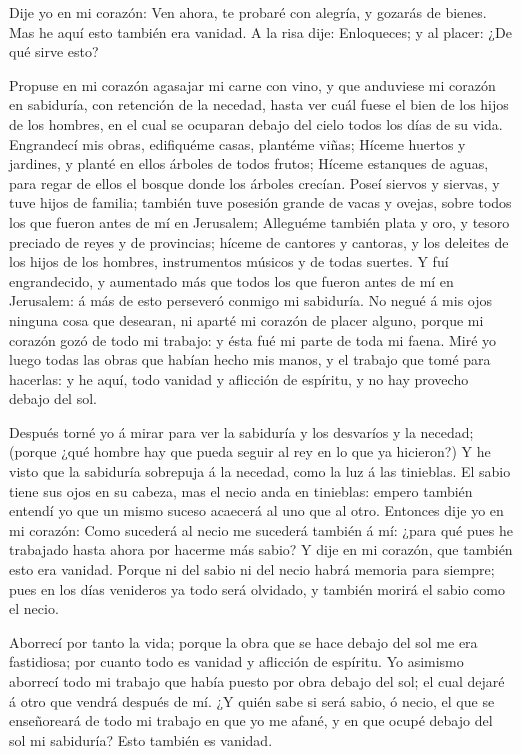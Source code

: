  Dije yo en mi corazón: Ven ahora, te probaré con alegría, y
gozarás de bienes. Mas he aquí esto también era vanidad.  A
la risa dije: Enloqueces; y al placer: ¿De qué sirve esto?

 Propuse en mi corazón agasajar mi carne con vino, y que
anduviese mi corazón en sabiduría, con retención de la necedad, hasta
ver cuál fuese el bien de los hijos de los hombres, en el cual se
ocuparan debajo del cielo todos los días de su vida. 
Engrandecí mis obras, edifiquéme casas, plantéme viñas; 
Híceme huertos y jardines, y planté en ellos árboles de todos frutos;
 Híceme estanques de aguas, para regar de ellos el bosque
donde los árboles crecían.  Poseí siervos y siervas, y tuve
hijos de familia; también tuve posesión grande de vacas y ovejas, sobre
todos los que fueron antes de mí en Jerusalem;  Alleguéme
también plata y oro, y tesoro preciado de reyes y de provincias; híceme
de cantores y cantoras, y los deleites de los hijos de los hombres,
instrumentos músicos y de todas suertes.  Y fuí
engrandecido, y aumentado más que todos los que fueron antes de mí en
Jerusalem: á más de esto perseveró conmigo mi sabiduría. 
No negué á mis ojos ninguna cosa que desearan, ni aparté mi corazón de
placer alguno, porque mi corazón gozó de todo mi trabajo: y ésta fué mi
parte de toda mi faena.  Miré yo luego todas las obras que
habían hecho mis manos, y el trabajo que tomé para hacerlas: y he aquí,
todo vanidad y aflicción de espíritu, y no hay provecho debajo del sol.

 Después torné yo á mirar para ver la sabiduría y los
desvaríos y la necedad; (porque ¿qué hombre hay que pueda seguir al rey
en lo que ya hicieron?)  Y he visto que la sabiduría
sobrepuja á la necedad, como la luz á las tinieblas.  El
sabio tiene sus ojos en su cabeza, mas el necio anda en tinieblas:
empero también entendí yo que un mismo suceso acaecerá al uno que al
otro.  Entonces dije yo en mi corazón: Como sucederá al
necio me sucederá también á mí: ¿para qué pues he trabajado hasta ahora
por hacerme más sabio? Y dije en mi corazón, que también esto era
vanidad.  Porque ni del sabio ni del necio habrá memoria
para siempre; pues en los días venideros ya todo será olvidado, y
también morirá el sabio como el necio.

 Aborrecí por tanto la vida; porque la obra que se hace
debajo del sol me era fastidiosa; por cuanto todo es vanidad y aflicción
de espíritu.  Yo asimismo aborrecí todo mi trabajo que
había puesto por obra debajo del sol; el cual dejaré á otro que vendrá
después de mí.  ¿Y quién sabe si será sabio, ó necio, el
que se enseñoreará de todo mi trabajo en que yo me afané, y en que ocupé
debajo del sol mi sabiduría? Esto también es vanidad.


